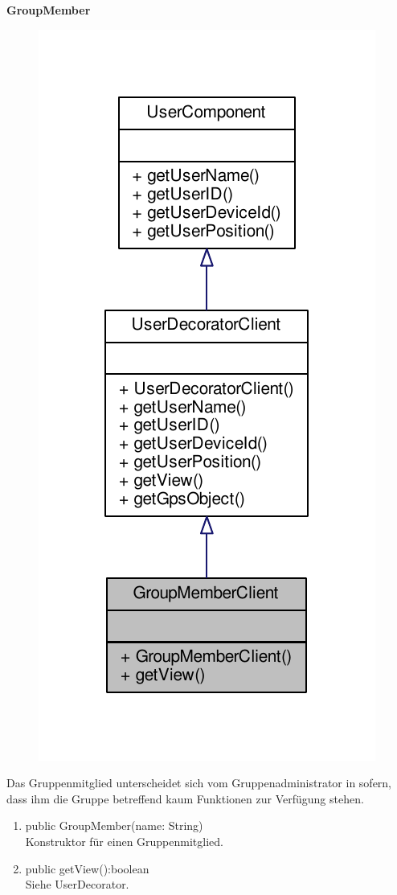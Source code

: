 \textbf{GroupMember}
\begin{figure}[H]
	\includegraphics[scale = 1]{res/umlClasses/group_member_client__coll__graph.pdf}
	\centering
\end{figure}
Das Gruppenmitglied unterscheidet sich vom Gruppenadministrator in sofern, dass ihm die Gruppe betreffend kaum Funktionen zur Verfügung stehen.  
\begin{enumerate}
	\item public GroupMember(name: String)\\
		Konstruktor für einen Gruppenmitglied.
	\item public getView():boolean\\
		Siehe UserDecorator.
\end{enumerate}

